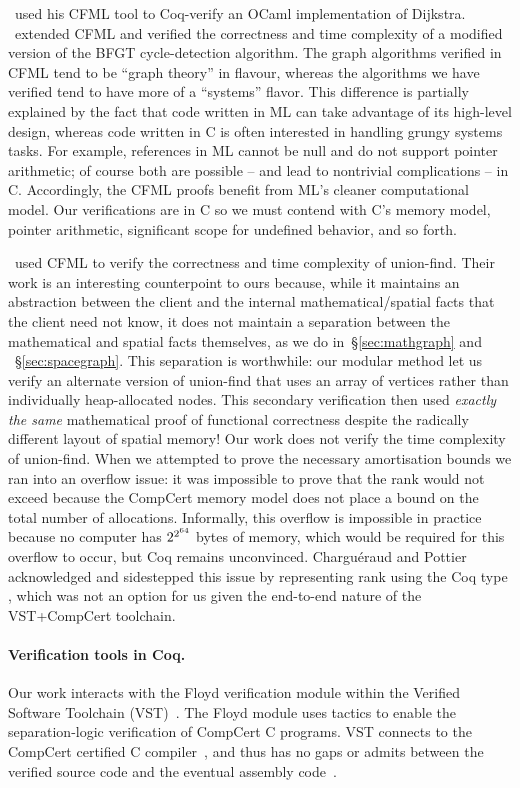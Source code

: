 \citet{char11}~used his CFML tool to Coq-verify an OCaml implementation of 
Dijkstra. 
\citet{gueneauetal19}~extended CFML and verified the correctness 
and time complexity of a modified version of the BFGT cycle-detection algorithm.
The graph algorithms verified in CFML tend to be ``graph theory'' in flavour, 
whereas the algorithms we have verified tend to have more of a
``systems'' flavor. This difference is partially explained by the fact that 
code written in ML can take advantage of its high-level design, whereas
code written in C is often interested in handling grungy systems tasks. For 
example, references in ML cannot be null and do not support pointer arithmetic; 
of course both are possible – and lead to nontrivial complications – in 
C. Accordingly, the CFML proofs benefit from ML’s cleaner computational model. 
Our verifications are in C so we must contend with C’s memory model, pointer 
arithmetic, significant scope for undefined behavior, and so forth.

\citet{charpott15, charpott19}~used CFML to verify the correctness and 
time complexity of union-find. Their work is an interesting counterpoint to 
ours because, while it maintains an abstraction between the client and the 
internal mathematical/spatial facts that the client need not know, it does 
not maintain a separation between the mathematical and spatial 
facts themselves, as we do in~\S\ref{sec:mathgraph} and ~\S\ref{sec:spacegraph}.
This separation is worthwhile: our modular method let us verify an alternate 
version of union-find that uses an array of vertices rather than individually 
heap-allocated nodes. This 
secondary verification then used \emph{exactly the same} mathematical proof of 
functional correctness despite the radically different layout of spatial 
memory! 
Our work does not verify the time complexity of union-find. When 
we attempted to prove the necessary amortisation bounds we ran into an 
overflow issue: it was impossible to prove that the rank would not exceed 
 because the CompCert memory model does not place a bound on the 
total number of allocations. Informally, this overflow is impossible in 
practice because no computer has $2^{2^{\tiny 64}}$ bytes of memory, which would 
be required for this overflow to occur, but Coq remains unconvinced. 
Chargu{\'{e}}raud and Pottier acknowledged and sidestepped this issue by 
representing rank using the Coq type , which was not an option for us 
given the end-to-end nature of the VST+CompCert toolchain.

\paragraph{Verification tools in Coq.}
Our work interacts with the Floyd verification module within the Verified 
Software Toolchain (VST)~\cite{appel:programlogics}. The Floyd module uses 
tactics to enable the separation-logic verification of CompCert C programs. 
VST connects to the CompCert certified C compiler~\cite{leroy:compcert}, and 
thus has no gaps or admits between the verified source code and the eventual
assembly code~\cite{appelvst}.

